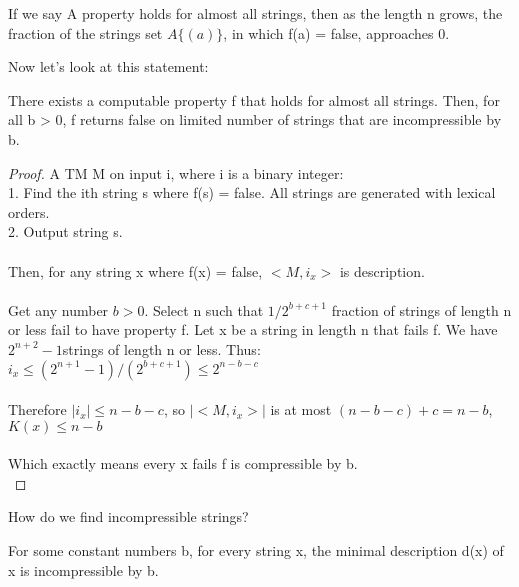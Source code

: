 \documentclass[12pt]{article}
\begin{document}
\begin{mydef3}
If we say A property holds for almost all strings, then as the length n grows, the fraction of the strings set $A\{(a)\}$, in which f(a) = false, approaches 0. 
\end{mydef3}

Now let's look at this statement:
\begin{mydef2}
There exists a computable property f that holds for almost all strings. Then, for all b > 0, f returns false on limited number of strings that are incompressible by b.
\end{mydef2}

\begin{proof}
A TM M on input i, where i is a binary integer:\\
    1. Find the ith string s where f(s) = false. All strings are generated with lexical orders.\\
    2. Output string s.\\
\\
Then, for any string x where f(x) = false, $<M, i_x>$ is description.\\
\\
Get any number $b > 0$. Select n such that $1/2^{b+c+1}$ fraction of strings of length n or less fail to have property f. Let x be a string in length n that fails f. We have $2^{n+2} - 1$strings of length n or less. Thus:\\
    $i_x \leq (2^{n+1} - 1) / (2^{b+c+1}) \leq 2^{n-b-c}$\\
\\
Therefore $|i_x| \leq n-b-c$, so $|<M, i_x>|$ is at most $(n-b-c)+c = n - b$,\\
    $K(x) \leq n - b$\\
\\
Which exactly means every x fails f is compressible by b.\\
\end{proof}

How do we find incompressible strings?\\
\begin{mydef2}
For some constant numbers b, for every string x, the minimal description d(x) of x is incompressible by b.
\end{mydef2}
\end{document}
